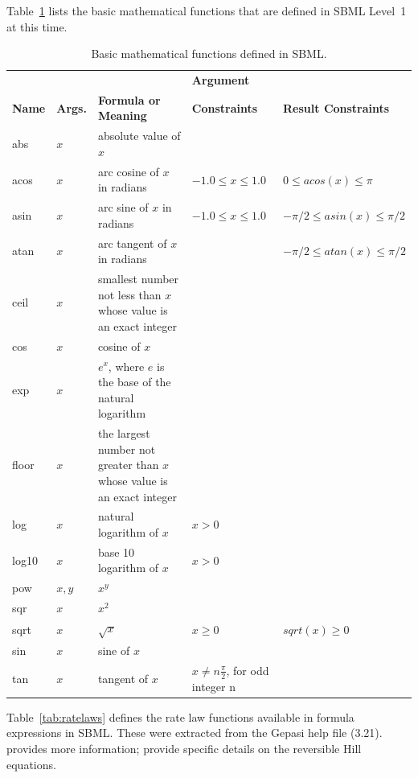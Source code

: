 \documentclass[10pt]{cekarticle}
\begin{document}
Table~\ref{tab:simplemath} lists the basic mathematical functions that are
defined in SBML Level~1 at this time.

\begin{table}[hb]
  \begin{center}
    \begin{tabular}{@{}p{1cm}p{0.8cm}p{5cm}p{4cm}p{3.8cm}@{}}
      \toprule
      &                &                             & \textbf{Argument} \\
      \textbf{Name} & \textbf{Args.} & \textbf{Formula or Meaning} & \textbf{Constraints} & \textbf{Result Constraints} \\
      \midrule
      abs   & $x$ & absolute value of $x$\\
      acos  & $x$ & arc cosine of $x$ in radians & $-1.0 \leq x \leq 1.0$ & $0 \leq acos(x) \leq \pi$ \\
      asin  & $x$ & arc sine of $x$ in radians & $-1.0 \leq x \leq 1.0$ & $-\pi/2 \leq asin(x) \leq \pi/2$ \\
      atan  & $x$ & arc tangent of $x$ in radians & & $-\pi/2 \leq atan(x) \leq \pi/2$ \\
      ceil  & $x$ & smallest number not less than $x$ whose value is an exact integer \\
      cos   & $x$ & cosine of $x$ \\
      exp   & $x$ & $e^x$, where $e$ is the base of the natural logarithm\\
      floor & $x$ & the largest number not greater than $x$ whose value is an exact integer \\
      log   & $x$ & natural logarithm of $x$ & $x > 0$ \\
      log10 & $x$ & base 10 logarithm of $x$ & $x > 0$ \\
      pow   & $x, y$ & $x^y$ \\
      sqr   & $x$ & $x^2$ \\
      sqrt  & $x$ & $\sqrt{x}$ & $x \geq 0$ & $sqrt(x) \geq 0$ \\
      sin   & $x$ & sine of $x$ \\
      tan   & $x$ & tangent of $x$ & $x \neq n \frac{\pi}{2}$, for odd integer n\\
      \bottomrule
    \end{tabular}
  \end{center}
  \caption{Basic mathematical functions defined in SBML.}
  \label{tab:simplemath}
\end{table}


Table~\ref{tab:ratelaws} defines the rate law functions available in
formula expressions in SBML.  These were extracted from the Gepasi help
file (3.21).  \citet{segel:1993} provides more information;
\citet{hofmeyr:1997} provide specific details on the reversible Hill
equations.
\end{document}
